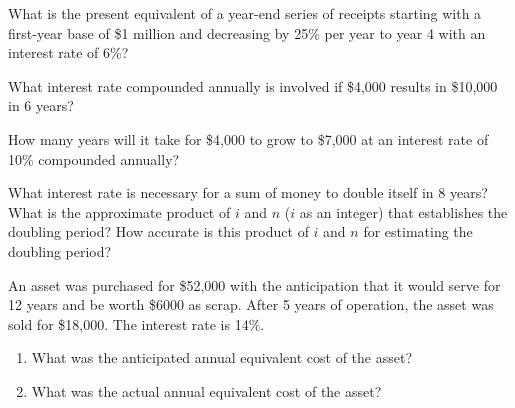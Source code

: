 \begin{exercises}
    \begin{exercise}
    \label{sea-08-05}
        What is the present equivalent of a year-end series of receipts starting with a first-year base of \$1 million and decreasing by 25\% per year to year 4 with an interest rate of 6\%?
    \end{exercise}
    \begin{solution}
    \end{solution}
    
    \begin{exercise}
    \label{sea-08-06}
        What interest rate compounded annually is involved if \$4,000 results in \$10,000 in 6 years?
    \end{exercise}
    \begin{solution}
    \end{solution}
    
    \begin{exercise}
    \label{sea-08-07}
        How many years will it take for \$4,000 to grow to \$7,000 at an interest rate of 10\% compounded annually?
    \end{exercise}
    \begin{solution}
    \end{solution}
    
    \begin{exercise}
    \label{sea-08-08}
        What interest rate is necessary for a sum of money to double itself in 8 years? What is the approximate product of $i$ and $n$ ($i$ as an integer) that establishes the doubling period? How accurate is this product of $i$ and $n$ for estimating the doubling period?
    \end{exercise}
    \begin{solution}
    \end{solution}
    
    \begin{exercise}
    \label{sea-08-09}
        An asset was purchased for \$52,000 with the anticipation that it would serve for 12 years and be worth \$6000 as scrap. After 5 years of operation, the asset was sold for \$18,000. The interest rate is 14\%.
        \begin{enumerate}[label=\alph*)]
            \item What was the anticipated annual equivalent cost of the asset?
            \item What was the actual annual equivalent cost of the asset?
        \end{enumerate}
    \end{exercise}
    \begin{solution}
    \end{solution}
    

\end{exercises}
